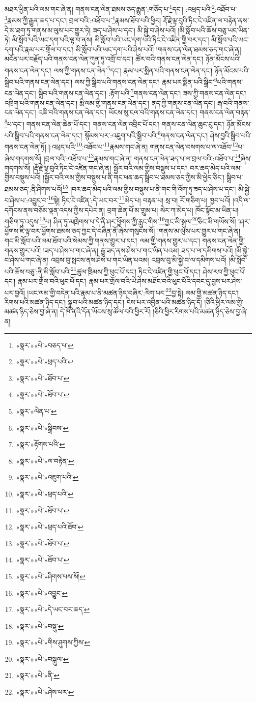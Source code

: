 མཐར་ཕྱིན་པའི་ལམ་གང་ཞེ་ན། གནས་ངན་ལེན་ཐམས་ཅད་རྒྱུན་:གཅོད་པ་\footnote{«སྣར་»«པེ་»བཅད་པ་}དང་། :འཕྲད་པའི་\footnote{«སྣར་»«པེ་»ཕྲད་པའི་}:འཐོབ་པ་\footnote{«སྣར་»«པེ་»ཐོབ་པ་}རྣམས་ཀྱི་རྒྱུན་ཆད་པ་དང་། བྲལ་བའི་:འཐོབ་པ་\footnote{«སྣར་»«པེ་»ཐོབ་པ་}རྣམས་ཐོབ་པའི་ཕྱིར། རྡོ་རྗེ་ལྟ་བུའི་ཏིང་ངེ་འཛིན་ལ་བརྟེན་ནས་དེ་མ་ཐག་ཏུ་གནས་མ་ལུས་པར་གྱུར་ཏེ། ཟད་པ་ཤེས་པ་དང་། མི་སྐྱེ་བ་ཤེས་པའོ། །མི་སློབ་པའི་ཆོས་བཅུ་ཡང་ཡིན་ཏེ། མི་སློབ་པའི་ཡང་དག་པའི་ལྟ་བ་ནས། མི་སློབ་པའི་ཡང་དག་པའི་ཏིང་ངེ་འཛིན་གྱི་བར་དང་། མི་སློབ་པའི་ཡང་དག་པའི་རྣམ་པར་གྲོལ་བ་དང་། མི་སློབ་པའི་ཡང་དག་པའི་ཤེས་པའོ། །གནས་ངན་ལེན་ཐམས་ཅད་གང་ཞེ་ན། མངོན་པར་བརྗོད་པའི་གནས་ངན་ལེན་ཀུན་ཏུ་འགྲོ་བ་དང་། ཚོར་བའི་གནས་ངན་ལེན་དང་། ཉོན་མོངས་པའི་གནས་ངན་ལེན་དང་། ལས་ཀྱི་གནས་ངན་ལེན་\footnote{«སྣར་»ལེན་པ་}དང་། རྣམ་པར་སྨིན་པའི་གནས་ངན་ལེན་དང་། ཉོན་མོངས་པའི་སྒྲིབ་པའི་གནས་ངན་ལེན་དང་། ལས་ཀྱི་སྒྲིབ་པའི་གནས་ངན་ལེན་དང་། རྣམ་པར་སྨིན་པའི་སྒྲིབ་\footnote{«སྣར་»«པེ་»སྒྲིབས་}པའི་གནས་ངན་ལེན་དང་། སྒྲིབ་པའི་གནས་ངན་ལེན་དང་། :རྟོག་པའི་\footnote{«སྣར་»རྟོགས་པའི་}གནས་ངན་ལེན་དང་། ཟས་ཀྱི་གནས་ངན་ལེན་དང་། འཁྲིག་པའི་གནས་ངན་ལེན་དང་། རྨི་ལམ་གྱི་གནས་ངན་ལེན་དང་། ནད་ཀྱི་གནས་ངན་ལེན་དང་། རྒ་བའི་གནས་ངན་ལེན་དང་། འཆི་བའི་གནས་ངན་ལེན་དང་། ཡོངས་སུ་ངལ་བའི་གནས་ངན་ལེན་དང་། གནས་ངན་ལེན་བརྟན་\footnote{«སྣར་»«པེ་»ལ་བརྟེན་}པ་དང་། གནས་ངན་ལེན་ཆེན་པོ་དང་། གནས་ངན་ལེན་འབྲིང་པོ་དང་། གནས་ངན་ལེན་ཆུང་ངུ་དང་། ཉོན་མོངས་པའི་སྒྲིབ་པའི་གནས་ངན་ལེན་དང་། སྙོམས་པར་:འཇུག་པའི་སྒྲིབ་པའི་\footnote{«སྣར་»«པེ་»འཇུག་པའི་}གནས་ངན་ལེན་དང་། ཤེས་བྱའི་སྒྲིབ་པའི་གནས་ངན་ལེན་ཏོ། །:འཕྲད་པའི་\footnote{«སྣར་»«པེ་»ཕྲད་པའི་}:འཐོབ་པ་\footnote{«སྣར་»«པེ་»ཐོབ་པ་}རྣམས་གང་ཞེ་ན། གནས་ངན་ལེན་བསགས་པ་ལ་འཐོབ་\footnote{«སྣར་»«པེ་»ཕྲད་པའི་ཐོབ་}པ་ཞེས་གདགས་སོ། །བྲལ་བའི་:འཐོབ་པ་\footnote{«སྣར་»«པེ་»ཐོབ་པ་}རྣམས་གང་ཞེ་ན། གནས་ངན་ལེན་ཟད་པ་ལ་བྲལ་བའི་:འཐོབ་པ་\footnote{«སྣར་»«པེ་»ཐོབ་པ་}ཞེས་གདགས་སོ། །རྡོ་རྗེ་ལྟ་བུའི་ཏིང་ངེ་འཛིན་གང་ཞེ་ན། སྦྱོར་བའི་ལམ་གྱིས་བསྡུས་པ་དང་། བར་ཆད་མེད་པའི་ལམ་གྱིས་བསྡུས་པའོ། །སྦྱོར་བའི་ལམ་གྱིས་བསྡུས་པ་ནི་གང་ཕན་ཆད་སྒྲིབ་པ་ཐམས་ཅད་ཀྱིས་མི་ཕྱེད་ཅིང་། སྒྲིབ་པ་ཐམས་ཅད་:ནི་ཤིགས་པའོ།\footnote{«སྣར་»«པེ་»ཤིགས་པས་སོ།} །བར་ཆད་མེད་པའི་ལམ་གྱིས་བསྡུས་པ་ནི་གང་གི་འོག་ཏུ་ཟད་པ་ཤེས་པ་དང་། མི་སྐྱེ་བ་ཤེས་པ་:འབྱུང་བ་\footnote{«སྣར་»«པེ་»འབྱུང་}སྟེ། ཏིང་ངེ་འཛིན་:དེ་ཡང་བར་\footnote{«སྣར་»«པེ་»དེ་ཡང་བར་ཆད་}མེད་པ། བརྟན་པ། སྲ་བ། རོ་གཅིག་པ། ཁྱབ་པའོ། །འདི་ལ་དགོངས་ནས་བཅོམ་ལྡན་འདས་ཀྱིས་དཔེར་ན། བྲག་ཆེན་པོ་མ་གྲུམ་པ། སེར་ཀ་མེད་པ། ཁོང་སྟོང་མ་ཡིན་པ། གཅིག་ཏུ་འདུས་\footnote{«སྣར་»«པེ་»བསྡུ་}པ། ཤིན་ཏུ་མཁྲེགས་པ་དེ་ནི་ཤར་ཕྱོགས་ཀྱི་རླུང་གིས་\footnote{«སྣར་»«པེ་»གིས་ཤུགས་ཀྱིས་}ཀྱང་མི་སྒུལ་\footnote{«སྣར་»«པེ་»བསྒུལ་}ཅིང་མི་གཡོས་སོ། །ཤར་ཕྱོགས་ཇི་ལྟ་བར་ཕྱོགས་ཐམས་ཅད་ཀྱང་དེ་བཞིན་ནོ་ཞེས་གསུངས་སོ། །གནས་མ་ལུས་པར་གྱུར་པ་གང་ཞེ་ན། གང་མི་སློབ་པའི་ལམ་ཐོབ་པའི་སེམས་ཀྱི་གནས་གྱུར་པ་དང་། ལམ་གྱི་གནས་གྱུར་པ་དང་། གནས་ངན་ལེན་གྱི་གནས་གྱུར་པའོ། །ཟད་པ་ཤེས་པ་གང་ཞེ་ན། རྒྱུ་ཟད་ནས་ཤེས་པ་གང་ཡིན་པའམ། ཟད་པ་ལ་དམིགས་པའོ། །མི་སྐྱེ་བ་ཤེས་པ་གང་ཞེ་ན། འབྲས་བུ་སྤངས་ནས་ཤེས་པ་གང་ཡིན་པའམ། འབྲས་བུ་མི་སྐྱེ་བ་ལ་དམིགས་པའོ། །མི་སློབ་པའི་ཆོས་བཅུ་:ནི་མི་སློབ་པའི་\footnote{«སྣར་»«པེ་»ནི་}ཚུལ་ཁྲིམས་ཀྱི་ཕུང་པོ་དང་། ཏིང་ངེ་འཛིན་གྱི་ཕུང་པོ་དང་། ཤེས་རབ་ཀྱི་ཕུང་པོ་དང་། རྣམ་པར་གྲོལ་བའི་ཕུང་པོ་དང་། རྣམ་པར་གྲོལ་བའི་ཡེ་ཤེས་མཐོང་བའི་ཕུང་པོའི་དབང་དུ་བྱས་པར་ཤེས་པར་བྱའོ། །ཡང་ལམ་གྱི་བདེན་པའི་རྣམ་པ་ནི་མཚན་ཉིད་བཞིར་:རིག་པར་\footnote{«སྣར་»«པེ་»ཤེས་པར་}བྱ་སྟེ། ལམ་གྱི་མཚན་ཉིད་དང་། རིགས་པའི་མཚན་ཉིད་དང་། སྒྲུབ་པའི་མཚན་ཉིད་དང་། ངེས་པར་འབྱིན་པའི་མཚན་ཉིད་དོ། །ཅིའི་ཕྱིར་ལམ་གྱི་མཚན་ཉིད་ཅེས་བྱ་ཞེ་ན། དེ་ཁོ་ནའི་དོན་ཡོངས་སུ་ཚོལ་བའི་ཕྱིར་རོ། །ཅིའི་ཕྱིར་རིགས་པའི་མཚན་ཉིད་ཅེས་བྱ་ཞེ་ན། 